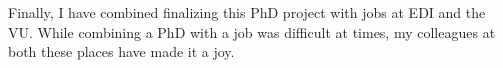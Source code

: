 Finally, I have combined finalizing this PhD project with jobs at EDI and the VU. While combining a PhD with a job was difficult at times, my colleagues at both these places have made it a joy.





